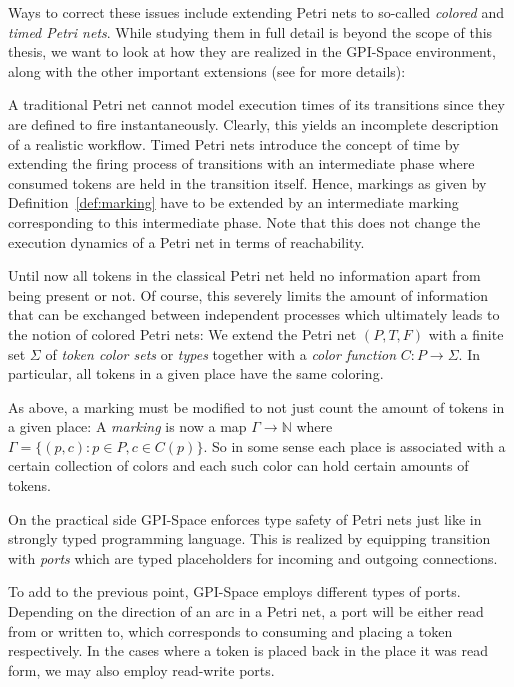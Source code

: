 \documentclass[
  paper=a4,
  titlepage,
  bibliography=totoc,
  pagesize=pdftex
]{scrartcl}
\numberwithin{figure}{section}
\numberwithin{equation}{section}
\numberwithin{table}{section}
\newcommand*\setN{\mathds{N}}
\theoremstyle{definition}
\numberwithin{definition}{section}
\begin{document}
Ways to correct these issues include extending Petri nets to so-called \emph{colored} and
\emph{timed Petri nets}. While studying them in full detail is beyond the scope of this
thesis, we want to look at how they are realized in the GPI-Space environment, along with
the other important extensions (see \cite[Section~3.2.2]{towardsParallel} for more
details): 
\begin{description}[leftmargin=\parindent]
  \item[Time:] A traditional Petri net cannot model execution times of its transitions
    since they are defined to fire instantaneously. Clearly, this yields an incomplete
    description of a realistic workflow. Timed Petri nets introduce the concept of time by
    extending the firing process of transitions with an intermediate phase where consumed
    tokens are held in the transition itself. Hence, markings as given by
    Definition~\ref{def:marking} have to be extended by an intermediate marking
    corresponding to this intermediate phase. Note that this does not change the execution
    dynamics of a Petri net in terms of reachability.
  \item[Tokens and Data:] Until now all tokens in the classical Petri net held no
    information apart from being present or not. Of course, this severely limits the
    amount of information that can be exchanged between independent processes which
    ultimately leads to the notion of colored Petri nets: We extend the Petri net
    $(P,T,F)$ with a finite set $\Sigma$ of \emph{token color sets} or \emph{types}
    together with a \emph{color function} $C:P\to\Sigma$. In particular, all tokens in a
    given place have the same coloring.

    As above, a marking must be modified to not just count the amount of tokens in a given
    place: A \emph{marking} is now a map $\Gamma \to \setN$ where $\Gamma = \{ (p,c) : p
    \in P, c \in C(p) \}$. So in some sense each place is associated with a certain
    collection of colors and each such color can hold certain amounts of tokens.

    On the practical side GPI-Space enforces type safety of Petri nets just like in
    strongly typed programming language. This is realized by equipping transition with
    \emph{ports} which are typed placeholders for incoming and outgoing connections.
  \item[Read-only ports:] To add to the previous point, GPI-Space employs different types
    of ports. Depending on the direction of an arc in a Petri net, a port will be either
    read from or written to, which corresponds to consuming and placing a token
    respectively. In the cases where a token is placed back in the place it was read form,
    we may also employ read-write ports.


\end{description}
\end{document}
